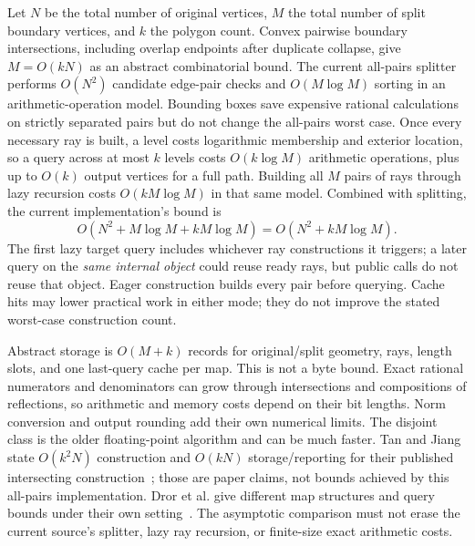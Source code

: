 \documentclass[12pt,a4paper]{article}
\newcommand{\code}[1]{{\ttfamily\color{codekw}#1}}
\begin{document}
Let \(N\) be the total number of original vertices, \(M\) the total number of split boundary vertices, and \(k\) the polygon count. Convex pairwise boundary intersections, including overlap endpoints after duplicate collapse, give \(M=O(kN)\) as an abstract combinatorial bound. The current all-pairs splitter performs \(O(N^2)\) candidate edge-pair checks and \(O(M\log M)\) sorting in an arithmetic-operation model. Bounding boxes save expensive rational calculations on strictly separated pairs but do not change the all-pairs worst case. Once every necessary ray is built, a level costs logarithmic membership and exterior location, so a query across at most \(k\) levels costs \(O(k\log M)\) arithmetic operations, plus up to \(O(k)\) output vertices for a full path. Building all \(M\) pairs of rays through lazy recursion costs \(O(kM\log M)\) in that same model. Combined with splitting, the current implementation's bound is
\[
O(N^2+M\log M+kM\log M)
=O(N^2+kM\log M).
\]
The first lazy target query includes whichever ray constructions it triggers; a later query on the \emph{same internal object} could reuse \code{ready} rays, but public calls do not reuse that object. Eager construction builds every pair before querying. Cache hits may lower practical work in either mode; they do not improve the stated worst-case construction count.

Abstract storage is \(O(M+k)\) records for original/split geometry, rays, length slots, and one last-query cache per map. This is not a byte bound. Exact rational numerators and denominators can grow through intersections and compositions of reflections, so arithmetic and memory costs depend on their bit lengths. Norm conversion and output rounding add their own numerical limits. The disjoint class is the older floating-point algorithm and can be much faster. Tan and Jiang state \(O(k^2N)\) construction and \(O(kN)\) storage/reporting for their published intersecting construction~\cite{tanjiang17}; those are paper claims, not bounds achieved by this all-pairs implementation. Dror et al. give different map structures and query bounds under their own setting~\cite{dror03}. The asymptotic comparison must not erase the current source's splitter, lazy ray recursion, or finite-size exact arithmetic costs.

\end{document}
